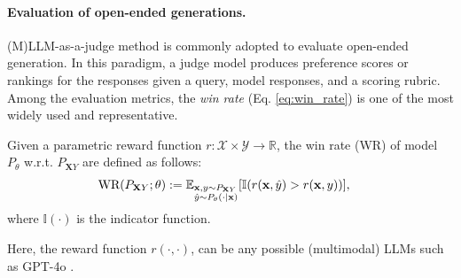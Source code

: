 \paragraph{Evaluation of open-ended generations.} 

(M)LLM-as-a-judge method \cite{zheng2023judging, kim2023prometheus} is commonly adopted to evaluate open-ended generation. In this paradigm, a judge model produces preference scores or rankings for the responses given a query, model responses, and a scoring rubric. Among the evaluation metrics, the \emph{win rate} (Eq. \eqref{eq:win_rate}) is one of the most widely used and representative.


\begin{definition} Given a parametric reward function $r:\mathcal{X}\times \mathcal{Y}\rightarrow \mathbb{R}$, the 
win rate (WR) of model $P_{\theta}$ w.r.t. $P_{\mathbf{X}Y}$ are defined as follows: 
\begin{equation} \label{eq:win_rate}
\begin{split}
    &\text{WR}(P_{\mathbf{X}Y};\theta):=\mathbb{E}_{\begin{subarray}{l} \mathbf{x},y \sim P_{\mathbf{X}Y} \\ \hat{y} \sim P_{\theta}(\cdot|\mathbf{x}) \end{subarray}}[\mathbb{I}(r(\mathbf{x},\hat{y}) > r(\mathbf{x},y))],
\end{split}
\end{equation}
where $\mathbb{I}(\cdot)$ is  the indicator function.
\end{definition}
Here, the reward function $r(\cdot,\cdot)$, can be any possible (multimodal) LLMs such as GPT-4o \cite{hurst2024gpt}.

